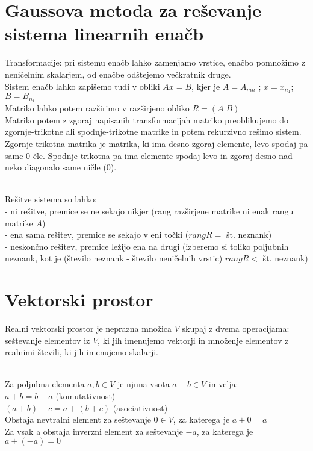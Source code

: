 \documentclass[12pt]{report}
\begin{document}
\section*{Gaussova metoda za reševanje sistema linearnih enačb}

Transformacije: pri sistemu enačb lahko zamenjamo vrstice, enačbo pomnožimo z neničelnim skalarjem, od enačbe odštejemo večkratnik druge.\\
Sistem enačb lahko zapišemo tudi v obliki $Ax=B$, kjer je $A=A_{mn}$ ; $x=x_{n_1}$; $B=B_{n_1}$\\
Matriko lahko potem razširimo v razširjeno obliko  $R=(A|B)$\\
Matriko potem z zgoraj napisanih transformacijah matriko preoblikujemo do zgornje-trikotne ali spodnje-trikotne matrike in potem rekurzivno rešimo sistem.
Zgornje trikotna matrika je matrika, ki ima desno zgoraj elemente, levo spodaj pa same 0-čle. Spodnje trikotna pa ima elemente spodaj levo in zgoraj desno nad neko diagonalo same ničle (0).\\\ 

Rešitve sistema so lahko:\\
- ni rešitve, premice se ne sekajo nikjer (rang razširjene matrike ni enak rangu matrike $A$)\\
- ena sama rešitev, premice se sekajo v eni točki ($rangR = $ št. neznank)\\
- neskončno rešitev, premice ležijo ena na drugi (izberemo si toliko poljubnih neznank, kot je (število neznank - število neničelnih vrstic) $rangR < $ št. neznank)



\section*{Vektorski prostor}


Realni vektorski prostor je neprazna množica $V$ skupaj z dvema operacijama: seštevanje elementov iz $V$, ki jih imenujemo vektorji in množenje elementov z realnimi števili, ki jih imenujemo skalarji.\\\

Za poljubna elementa $a,b \in V$ je njuna vsota $a+b \in V$ in velja:\\
$a+b=b+a$ (komutativnost)\\
$(a+b)+c=a+(b+c)$ (asociativnost)\\
Obstaja nevtralni element za seštevanje $0 \in V $, za katerega je $a+0=a$\\
Za vsak a obstaja inverzni element za seštevanje $-a$, za katerega je $a+(-a)=0$\\\
\end{document}
